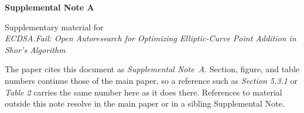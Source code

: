 \documentclass[envcountsame,runningheads,notitlepage]{llncs}
\begin{document}
\begin{center}
  {\large\bfseries Supplemental Note A\par}
  \vspace{0.9em}
  {\small Supplementary material for\\[0.25em]
   \emph{ECDSA.Fail: Open Autoresearch for Optimizing Elliptic-Curve Point Addition in Shor's Algorithm}\\[1.0em]
   \begin{minipage}{0.86\linewidth}\small\itshape\raggedright
   The paper cites this document as \emph{Supplemental Note~A}.
   Section, figure, and table numbers continue those of the main paper, so a
   reference such as \emph{Section 5.3.1} or \emph{Table 2} carries the same
   number here as it does there. References to material outside this note
   resolve in the main paper or in a sibling Supplemental Note.
   \end{minipage}\par}
\end{center}
\vspace{1.5em}
\appendix
\setcounter{table}{4}
\setcounter{section}{0}



\end{document}
